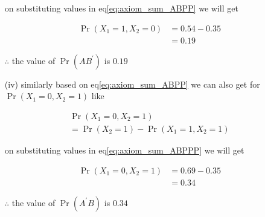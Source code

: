 \documentclass[journal,12pt,twocolumn]{IEEEtran}
\providecommand{\pr}[1]{\ensuremath{\Pr\left(#1\right)}}
\begin{document}
\begin{enumerate}
            on substituting values in eq\eqref{eq:axiom_sum_ABPP} we will get
            
            \begin{align}
                     \pr{X_{1} = 1 ,X_{2} = 0 } &= 0.54 - 0.35 \\
                                       &= 0.19
            \end{align}
            
            $\therefore$ the value of $\pr{A B^{\prime}}$ is $0.19$
            
            
            
    \item[(iv)] similarly based on eq\eqref{eq:axiom_sum_ABPP} we can also get for $\pr{X_{1} = 0 , X_{2} = 1 }$ like 
    
            \begin{multline}
                   \pr{X_{1} = 0 ,X_{2} = 1 } \\
                   =  \pr{X_{2} = 1} - \pr{X_{1} = 1 ,X_{2} = 1}
                   \label{eq:axiom_sum_ABPPP}
            \end{multline}
            
            on substituting values in eq\eqref{eq:axiom_sum_ABPPP} we will get

            \begin{align}
                     \pr{X_{1} = 0 ,X_{2} = 1} &= 0.69 - 0.35 \\
                                               &= 0.34
            \end{align}
            
            $\therefore$ the value of $\pr{A^{\prime} B}$ is $0.34$
            
            

\end{enumerate}
\end{document}
